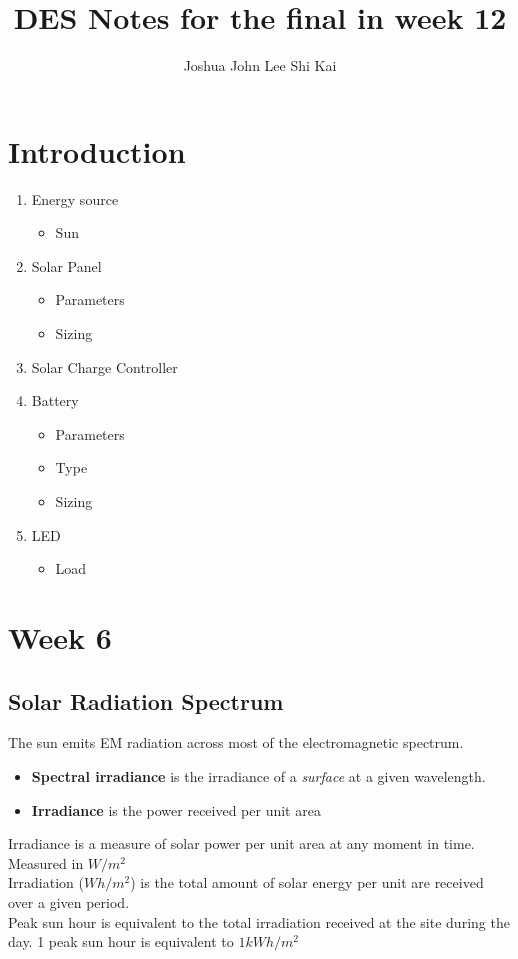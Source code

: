 \documentclass{article}
\title{DES Notes for the final in week 12}
\author{Joshua John Lee Shi Kai}
\begin{document}
\maketitle
\tableofcontents
\newpage
\section*{Introduction}

\begin{enumerate}
	\item Energy source
	      \begin{itemize}
		      \item Sun
	      \end{itemize}
	\item Solar Panel
	      \begin{itemize}
		      \item Parameters
		      \item Sizing
	      \end{itemize}
	\item Solar Charge Controller
	\item Battery
	      \begin{itemize}
		      \item Parameters
		      \item Type
		      \item Sizing
	      \end{itemize}
	\item LED
	      \begin{itemize}
		      \item Load
	      \end{itemize}
\end{enumerate}

\section{Week 6}
\subsection{Solar Radiation Spectrum}
The sun emits EM radiation across most of the electromagnetic spectrum.
\begin{itemize}
	\item \textbf{Spectral irradiance} is the irradiance of a \textit{surface}
	      at a given wavelength.
	\item \textbf{Irradiance} is the power received per unit area
\end{itemize}
Irradiance is a measure of solar power per unit area at any moment
in time. Measured in $W/m^2$ \\
Irradiation ($Wh/m^2$) is the total amount of solar energy per unit
are received over a given period.\\
Peak sun hour is equivalent to the total irradiation
received at the site during the day. 1 peak sun hour is equivalent to
$1kWh/m^2$
\end{document}
